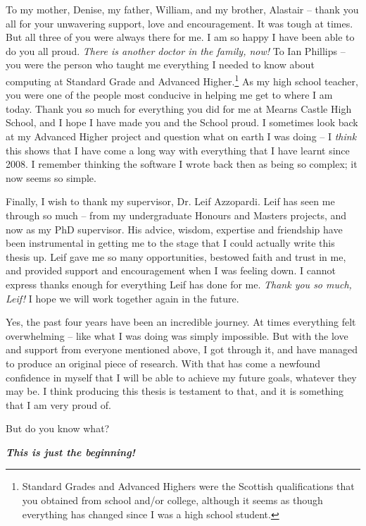 \begin{preamble}
To my mother, Denise, my father, William, and my brother, Alastair -- thank you all for your unwavering support, love and encouragement. It was tough at times. But all three of you were always there for me. I am so happy I have been able to do you all proud. \emph{There is another doctor in the family, now!} To Ian Phillips -- you were the person who taught me everything I needed to know about computing at Standard Grade and Advanced Higher.\footnote{Standard Grades and Advanced Highers were the Scottish qualifications that you obtained from school and/or college, although it seems as though everything has changed since I was a high school student.} As my high school teacher, you were one of the people most conducive in helping me get to where I am today. Thank you so much for everything you did for me at Mearns Castle High School, and I hope I have made you and the School proud. I sometimes look back at my Advanced Higher project and question what on earth I was doing -- I \emph{think} this shows that I have come a long way with everything that I have learnt since 2008. I remember thinking the software I wrote back then as being so complex; it now seems so simple.

Finally, I wish to thank my supervisor, Dr. Leif Azzopardi. Leif has seen me through so much -- from my undergraduate Honours and Masters projects, and now as my PhD supervisor. His advice, wisdom, expertise and friendship have been instrumental in getting me to the stage that I could actually write this thesis up. Leif gave me so many opportunities, bestowed faith and trust in me, and provided support and encouragement when I was feeling down. I cannot express thanks enough for everything Leif has done for me. \emph{Thank you so much, Leif!} I hope we will work together again in the future.

Yes, the past four years have been an incredible journey. At times everything felt overwhelming -- like what I was doing was simply impossible. But with the love and support from everyone mentioned above, I got through it, and have managed to produce an original piece of research. With that has come a newfound confidence in myself that I will be able to achieve my future goals, whatever they may be. I think producing this thesis is testament to that, and it is something that I am very proud of.

But do you know what?

\textbf{\emph{This is just the beginning!}}

\end{preamble}


